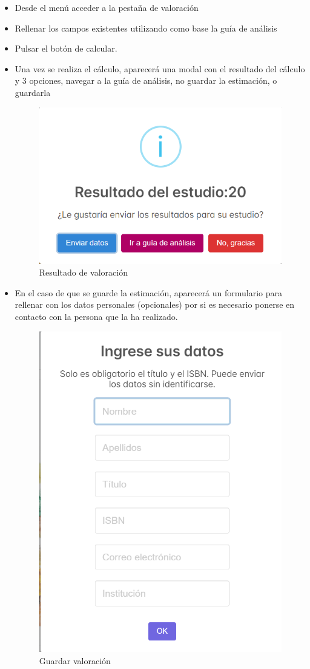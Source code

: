 \begin{itemize}
    \item Desde el menú acceder a la pestaña de valoración
    \item Rellenar los campos existentes utilizando como base la guía de análisis
    \item Pulsar el botón de calcular.
    \item Una vez se realiza el cálculo, aparecerá una modal con el resultado del cálculo y 3 opciones, navegar a la guía de análisis, no guardar la estimación, o guardarla
    \begin{figure}[h]
        \centering
        \includegraphics[width=0.6\linewidth]{Imagenes/ManualResultadoValoracion.png}
        \caption{Resultado de valoración}
        \label{Resultado de valoración}
    \end{figure}
    \FloatBarrier
    
    \item En el caso de que se guarde la estimación, aparecerá un formulario para rellenar con los datos personales (opcionales) por si es necesario ponerse en contacto con la persona que la ha realizado.
    \begin{figure}[h]
        \centering
        \includegraphics[width=0.5\linewidth]{Imagenes/ManualGuardarValoracion.png}
        \caption{Guardar valoración}
        \label{Guardar valoración}
    \end{figure}
\end{itemize}
\FloatBarrier

